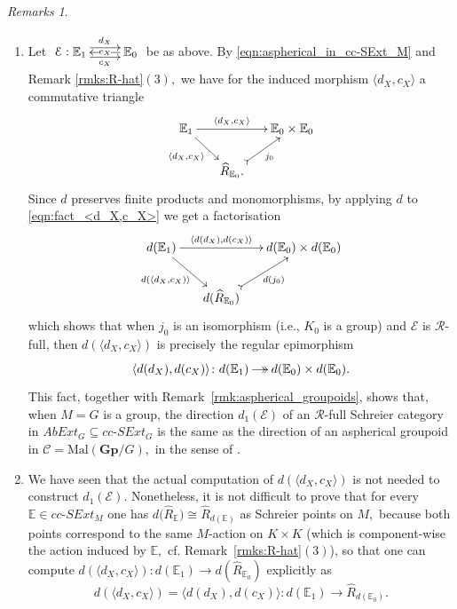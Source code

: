 \documentclass[a4paper]{amsart}
\theoremstyle{plain}
\theoremstyle{definition}
\theoremstyle{remark}
\newtheorem{remarks}[subsection]{Remarks}
\newcommand{\la}{\langle}
\newcommand{\ra}{\rangle}
\begin{document}
\begin{remarks}
\label{rmk:d_1-is-d_1}
\begin{enumerate}
\item Let $\xymatrix{
{\mathcal{E}:{{\mathbb{E}}_1}} \ar@<.9ex>[r]^-{d_X} \ar@<-.9ex>[r]_-{c_X} &{{\mathbb{E}}_0} \ar[l]|-{e_X}
}$ be as above. By \eqref{eqn:aspherical_in_cc-SExt_M} and Remark \ref{rmks:R-hat}$(3),$ we have for the induced morphism $\la d_X,c_X\ra$ a commutative triangle
\begin{equation}
\label{eqn:fact_<d_X,c_X>}
\begin{aligned}
\xymatrixcolsep{1.3pc}
\xymatrixrowsep{1.5pc}
\xymatrix{
{{\mathbb{E}}_1} \ar[rr]^-{\la d_X,c_X\ra} \ar[rd]_-{\la d_X,c_X\ra} &\ &{{\mathbb{E}}_0\times{\mathbb{E}}_0} \\
&{\widehat{R}_{{\mathbb{E}}_0}.} \ar@{>->}[ru]_-{j_0} &\
}
\end{aligned}
\end{equation}
Since $d$ preserves finite products and monomorphisms, by applying $d$ to \eqref{eqn:fact_<d_X,c_X>} we get a factorisation
\begin{equation*}
\xymatrixcolsep{1.3pc}
\xymatrix{
{d({\mathbb{E}}_1)} \ar[rr]^-{\la d(d_X),d(c_X)\ra} \ar[rd]_-{d(\la d_X,c_X)\ra} &\ &{d({\mathbb{E}}_0)\times d({\mathbb{E}}_0)} \\
&{d(\widehat{R}_{{\mathbb{E}}_0})} \ar@{>->}[ru]_-{d(j_0)} &\
}
\end{equation*}
which shows that when $j_0$ is an isomorphism (i.e., $K_0$ is a group) and $\mathcal{E}$ is $\mathcal{R}$-full, then $d(\la d_X,c_X\ra)$ is precisely the regular epimorphism
\begin{equation*}
\xymatrixcolsep{1pc}\xymatrix{{\la d(d_X),d(c_X)\ra\colon d({\mathbb{E}}_1)} \ar@{->>}[r] &{d({\mathbb{E}}_0)\times d({\mathbb{E}}_0).}}
\end{equation*}
This fact, together with Remark~\ref{rmk:aspherical_groupoids}, shows that, when $M=G$ is a group, the direction $d_1(\mathcal{E})$ of an $\mathcal{R}$-full Schreier category in $AbExt_G\subseteq cc\text{-}SExt_G$ is the same as the direction of an aspherical groupoid in $\mathcal{C}=\mathrm{Mal}(\mathbf{Gp}/G),$ in the sense of \cite{aspherical, Bourn-Rodelo}.
\item We have seen that the actual computation of $d(\la d_X,c_X\ra)$ is not needed to construct $d_1(\mathcal{E}).$ Nonetheless, it is not difficult to prove that for every $\mathbb{E}\in cc\text{-}SExt_M$ one has $d\Big(\widehat{R}_{\mathbb{E}}\Big)\cong\widehat{R}_{d(\mathbb{E})}$ as Schreier points on $M,$ because both points correspond to the same $M$-action on $K\times K$ (which is component-wise the action induced by $\mathbb{E},$ cf. Remark~\ref{rmks:R-hat}$(3)$), so that one can compute $d(\la d_X,c_X\ra)\colon d({\mathbb{E}}_1)\longrightarrow d(\widehat{R}_{{\mathbb{E}}_0})$ explicitly as
\begin{equation*}
d(\la d_X,c_X\ra)=\la d(d_X),d(c_X) \ra\colon d({\mathbb{E}}_1)\longrightarrow \widehat{R}_{d({\mathbb{E}}_0)}.
\end{equation*}
\end{enumerate}
\end{remarks}
\end{document}
